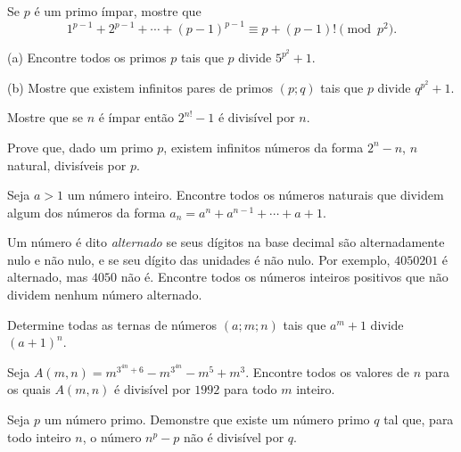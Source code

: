 \documentclass[10pt,a4paper]{article}
\begin{document}
	\begin{prob} Se $p$ é um primo ímpar, mostre que
	$$1^{p-1}+2^{p-1}+\cdots+(p-1)^{p-1}\equiv p+(p-1)!\pmod{p^2}.$$
	\end{prob}

	\begin{prob} (a) Encontre todos os primos $p$ tais que $p$ divide $5^{p^2} +
	1$.
	\end{prob}

	\begin{prob}{(b)} Mostre que existem infinitos pares de primos $(p;q)$ tais
	que $p$ divide $q^{p^2} + 1$.
	\end{prob}

	\begin{prob} Mostre que se $n$ é ímpar então $2^{n!} - 1$ é divisível por $n$.
	\end{prob}

	\begin{prob} Prove que, dado um primo $p$, existem infinitos números da forma
	$2^n - n$, $n$ natural, divisíveis por $p$.
	\end{prob}

	\begin{prob} Seja $a > 1$ um número inteiro. Encontre todos os números naturais
	que dividem algum dos números da forma $a_n = a^n + a^{n-1} + \cdots +
	a + 1$.
	\end{prob}

	\begin{prob} Um número é dito {\sl alternado} se seus dígitos na base decimal
	são alternadamente nulo e não nulo, e se seu dígito das unidades é não
	nulo. Por exemplo, $4050201$ é alternado, mas $4050$ não é. Encontre
	todos os números inteiros positivos que não dividem nenhum número
	alternado.
	\end{prob}

	\begin{prob} Determine todas as ternas de números $(a;m;n)$ tais que $a^m + 1$
	divide $(a + 1)^n$.
	\end{prob}

	\begin{prob} Seja $A(m,n) = m^{3^{4n} + 6} - m^{3^{4n}} - m^5 + m^3$. Encontre
	todos os valores de $n$ para os quais $A(m,n)$ é divisível por $1992$
	para todo $m$ inteiro.
	\end{prob}

	\begin{prob} Seja $p$ um número primo. Demonstre que existe um número primo $q$
	tal que, para todo inteiro $n$, o número $n^p - p$ não é divisível por
	$q$.
	\end{prob}
\end{document}
